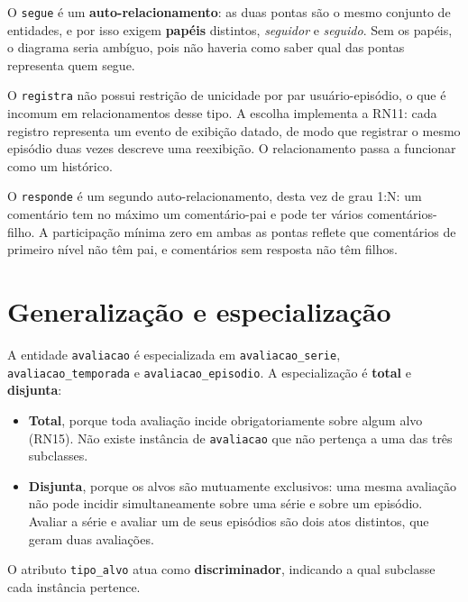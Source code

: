 \documentclass[a4paper,12pt,oneside,openany]{book}
\newif\iforientacoes
\newcommand{\orientacao}[1]{%
    \iforientacoes
        \begin{quote}
        \small\itshape\textbf{Orientação:} #1
        \end{quote}
    \fi
}
\newcommand{\id}[1]{\texttt{#1}}
\begin{document}
O \id{segue} é um \textbf{auto-relacionamento}: as duas pontas são o mesmo conjunto de entidades, e por isso exigem \textbf{papéis} distintos, \textit{seguidor} e
\textit{seguido}. Sem os papéis, o diagrama seria ambíguo, pois
não haveria como saber qual das pontas representa quem segue.

O \id{registra} não possui restrição de unicidade por par usuário-episódio, o que é
incomum em relacionamentos desse tipo. A escolha implementa a RN11: cada registro
representa um evento de exibição datado, de modo que registrar o mesmo episódio duas
vezes descreve uma reexibição. O relacionamento passa a funcionar como um histórico.

O \id{responde} é um segundo auto-relacionamento, desta vez de grau 1:N: um
comentário tem no máximo um comentário-pai e pode ter vários comentários-filho. A
participação mínima zero em ambas as pontas reflete que comentários de primeiro
nível não têm pai, e comentários sem resposta não têm filhos.

\section{Generalização e especialização}\label{sec:especializacao}

A entidade \id{avaliacao} é especializada em \id{avaliacao\_serie},
\id{avaliacao\_temporada} e \id{avaliacao\_episodio}. A especialização é
\textbf{total} e \textbf{disjunta}:

\begin{itemize}[nosep]
    \item \textbf{Total}, porque toda avaliação incide obrigatoriamente sobre
    algum alvo (RN15). Não existe instância de \id{avaliacao} que não pertença a
    uma das três subclasses.
    \item \textbf{Disjunta}, porque os alvos são mutuamente exclusivos: uma mesma
    avaliação não pode incidir simultaneamente sobre uma série e sobre um
    episódio. Avaliar a série e avaliar um de seus episódios são dois atos
    distintos, que geram duas avaliações.
\end{itemize}

O atributo \id{tipo\_alvo} atua como \textbf{discriminador}, indicando a qual
subclasse cada instância pertence.

\orientacao{Esta é a decisão de projeto mais importante do capítulo, e deve ser
retomada na Seção~\ref{sec:mapeamento} quando o mapeamento for feito. A alternativa
descartada é descrita abaixo -- vale reproduzir esse raciocínio na apresentação,
porque demonstra que a escolha foi consciente.}
\end{document}
